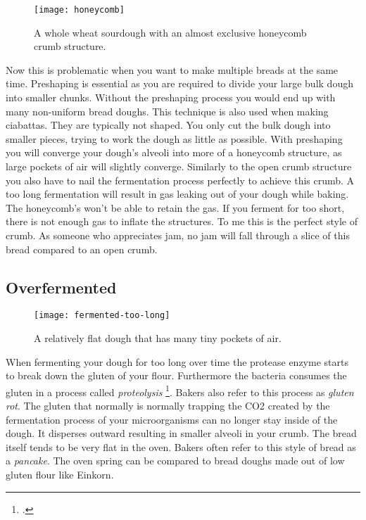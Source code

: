 \begin{figure}
  \texttt{[image: honeycomb]}
  \caption{A whole wheat sourdough with an almost exclusive honeycomb crumb structure.}
  \label{fig:honeycomb}
\end{figure}


Now this is problematic when you want to
make multiple breads at the same time. Preshaping is essential as you are required
to divide your large bulk dough into smaller chunks. Without the preshaping
process you would end up with many non-uniform bread doughs. This technique is
also used when making ciabattas. They are typically not shaped. You only cut the
bulk dough into smaller pieces, trying to work the dough as little as possible.
With preshaping you will converge your dough's alveoli into more of a honeycomb structure,
as large pockets of air will slightly converge. Similarly to the open crumb structure
you also have to nail the fermentation process perfectly to achieve this crumb.
A too long fermentation will result in gas leaking out of your dough while baking.
The honeycomb's won't be able to retain the gas. If you ferment for too short,
there is not enough gas to inflate the structures. To me this is the perfect
style of crumb. As someone who appreciates jam, no jam will fall through a slice
of this bread compared to an open crumb.

\subsection{Overfermented}
\label{sec:overfermented-dough}

\begin{figure}
  \texttt{[image: fermented-too-long]}
  \caption{A relatively flat dough that has many tiny pockets of air.}
  \label{fig:fermented-too-long}
\end{figure}

When fermenting your dough for too long over time the protease enzyme starts to
break down the gluten of your flour. Furthermore the bacteria consumes the gluten
in a process called {\it proteolysis} \footcite{raffaella+di+cagno}.
Bakers also refer to this process as {\it gluten rot}.
The gluten that normally is normally trapping the CO2 created
by the fermentation process of your microorganisms can no longer stay inside of
the dough. It disperses outward resulting in smaller alveoli in your crumb.
The bread itself tends to be very flat in the oven. Bakers often refer
to this style of bread as a {\it pancake}. The oven spring can be compared
to bread doughs made out of low gluten flour like Einkorn.

